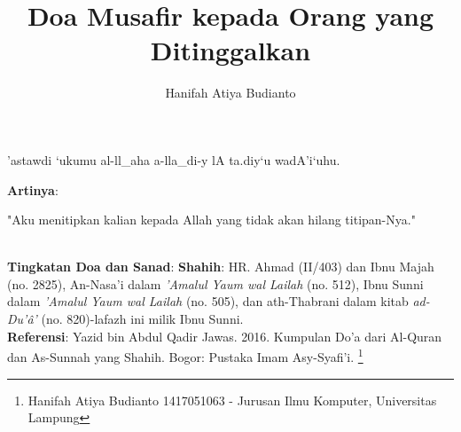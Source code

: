 \documentclass[a4paper,12pt]{article}
\title{\Large Doa Musafir kepada Orang yang Ditinggalkan}
\author{\calligra Hanifah Atiya Budianto}
\begin{document}
\sffamily
\maketitle 
\fullvocalize
{}
\begin{arabtext}
\noindent
'astawdi `ukumu al-ll_aha a-lla_di-y lA ta.diy`u wadA'i`uhu.\\
\end{arabtext}
\noindent
\textbf{Artinya}:
\par
\indent
"Aku menitipkan kalian kepada Allah yang tidak akan hilang titipan-Nya."
\\\\
\par
\noindent
\textbf{Tingkatan Doa dan Sanad}: \textbf{Shahih}: HR. Ahmad (II/403) dan 
Ibnu Majah (no. 2825), An-Nasa'i dalam \textit{'Amalul Yaum wal Lailah} 
(no. 512), Ibnu Sunni dalam \textit{'Amalul Yaum wal Lailah} (no. 505), dan
ath-Thabrani dalam kitab \textit{ad-Du'\^{a}'} (no. 820)-lafazh ini milik 
Ibnu Sunni.\\
\textbf{Referensi}: Yazid bin Abdul Qadir Jawas. 2016. Kumpulan Do'a dari
Al-Quran dan As-Sunnah yang Shahih. Bogor: Pustaka Imam Asy-Syafi'i.
\footnote{Hanifah Atiya Budianto 1417051063 - Jurusan Ilmu Komputer,
Universitas Lampung}
\end{document}
